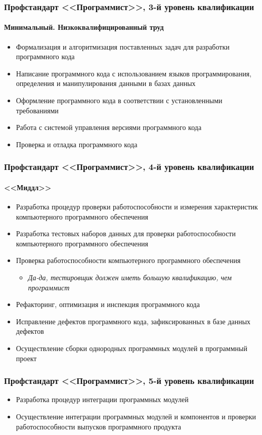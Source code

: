\documentclass{../../slides-style}
\begin{document}
    \begin{frame}
        \frametitle{Профстандарт <<Программист>>, 3-й уровень квалификации}
        \framesubtitle{Минимальный. Низкоквалифицированный труд}
        \begin{itemize}
            \item Формализация и алгоритмизация поставленных задач для разработки программного кода
            \item Написание программного кода с использованием языков программирования, определения и манипулирования данными в базах данных
            \item Оформление программного кода в соответствии с установленными требованиями
            \item Работа с системой управления версиями программного кода
            \item Проверка и отладка программного кода
        \end{itemize}
    \end{frame}

    \begin{frame}
        \frametitle{Профстандарт <<Программист>>, 4-й уровень квалификации}
        \framesubtitle{<<Миддл>>}
        \begin{itemize}
            \item Разработка процедур проверки работоспособности и измерения характеристик компьютерного программного обеспечения
            \item Разработка тестовых наборов данных для проверки работоспособности компьютерного программного обеспечения
            \item Проверка работоспособности компьютерного программного обеспечения
            \begin{itemize}
                \item \emph{Да-да, тестировщик должен иметь большую квалификацию, чем программист}
            \end{itemize}
            \item Рефакторинг, оптимизация и инспекция программного кода
            \item Исправление дефектов программного кода, зафиксированных в базе данных дефектов
            \item Осуществление сборки однородных программных модулей в программный проект
        \end{itemize}
    \end{frame}

    \begin{frame}
        \frametitle{Профстандарт <<Программист>>, 5-й уровень квалификации}
        \begin{itemize}
            \item Разработка процедур интеграции программных модулей
            \item Осуществление интеграции программных модулей и компонентов и проверки работоспособности выпусков программного продукта
        \end{itemize}
    \end{frame}
\end{document}
